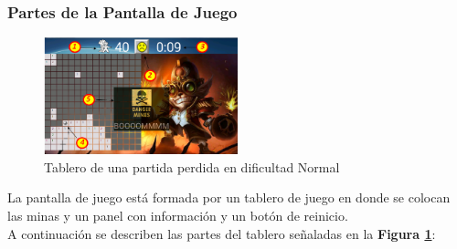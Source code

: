 \documentclass[11pt]{article} %
\begin{document}
\newpage
\thispagestyle{empty}

\subsubsection{\textbf{Partes de la Pantalla de Juego}}

\begin{center}

	\begin{figure}[h!]
  		\centering
    		\includegraphics[width=0.5\textwidth]{imagenes/partesdeltablero2.PNG}
  		\caption{Tablero de una partida perdida en dificultad Normal}
		\label{partesdeltablero}
	\end{figure}
\end{center}

La pantalla de juego est\'a formada por un tablero de juego en donde se colocan las minas y un panel con informaci\'on y un bot\'on de reinicio.
\\A continuaci\'on se describen las partes del tablero se\~naladas en la \textbf{Figura \ref{partesdeltablero}}:
\end{document}

